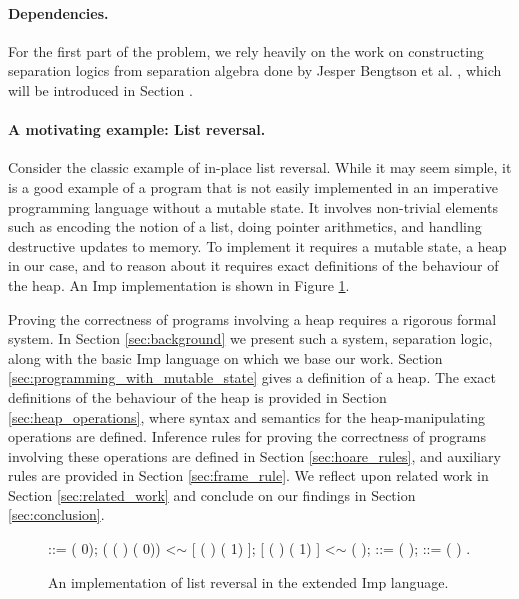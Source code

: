 \paragraph{Dependencies.}
For the first part of the problem, we rely heavily on the work on constructing separation logics from separation algebra done by Jesper Bengtson et al. , which will be introduced in Section .


\paragraph{A motivating example: List reversal.}
Consider the classic example of in-place list reversal. While it may seem simple, it is a good example of a program that is not easily implemented in an imperative programming language without a mutable state. It involves non-trivial elements such as encoding the notion of a list, doing pointer arithmetics, and handling destructive updates to memory. To implement it requires a mutable state, a heap in our case, and to reason about it requires exact definitions of the behaviour of the heap. An Imp implementation is shown in Figure \ref{fig:list_reversal}.

Proving the correctness of programs involving a heap requires a rigorous formal system. In Section \ref{sec:background} we present such a system, separation logic, along with the basic Imp language on which we base our work. Section \ref{sec:programming_with_mutable_state} gives a definition of a heap. The exact definitions of the behaviour of the heap is provided in Section \ref{sec:heap_operations}, where syntax and semantics for the heap-manipulating operations are defined. Inference rules for proving the correctness of programs involving these operations are defined in Section \ref{sec:hoare_rules}, and auxiliary rules are provided in Section \ref{sec:frame_rule}. We reflect upon related work in Section \ref{sec:related_work} and conclude on our findings in Section \ref{sec:conclusion}.


\begin{figure}
\begin{coqdoccode}
\coqdocindent{7.00em}
 ::= ( 0);\coqdoceol
\coqdocindent{7.00em}
  ( ( ) ( 0)) \coqdoceol
\coqdocindent{10.00em}
 <$\sim$ [  ( ) ( 1) ];\coqdoceol
\coqdocindent{10.00em}
[  ( ) ( 1) ] <$\sim$ ( );\coqdoceol
\coqdocindent{10.00em}
 ::= ( );\coqdoceol
\coqdocindent{10.00em}
 ::= ( )\coqdoceol
\coqdocindent{7.00em}
.\coqdoceol
\end{coqdoccode}
\caption{An implementation of list reversal in the extended Imp language.}
\label{fig:list_reversal}
\end{figure}